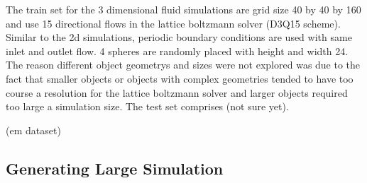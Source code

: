 \documentclass{article}
\begin{document}
The train set for the 3 dimensional fluid simulations are grid size 40 by 40 by 160 and use 15 directional flows in the lattice boltzmann solver (D3Q15 scheme). Similar to the 2d simulations, periodic boundary conditions are used with same inlet and outlet flow. 4 spheres are randomly placed with height and width 24. The reason different object geometrys and sizes were not explored was due to the fact that smaller objects or objects with complex geometries tended to have too course a resolution for the lattice boltzmann solver and larger objects required too large a simulation size. The test set comprises (not sure yet).

(em dataset)

\subsection{Generating Large Simulation}
\end{document}
